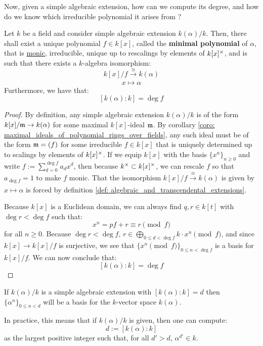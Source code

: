         Now, given a simple algebraic extension, how can we compute its degree, and how do we know which irreducible polynomial it arises from ?
        \begin{proposition} \label{prop: minimal_polynomials}
            Let $k$ be a field and consider simple algebraic extension $k(\alpha)/k$. Then, there shall exist a unique polynomial $f \in k[x]$, called the \textbf{minimal polynomial} of $\alpha$, that is \underline{monic}, irreducible, unique up to rescalings by elements of $k[x]^{\x}$, and is such that there exists a $k$-algebra isomorphism:
                $$k[x]/f \xrightarrow[]{\cong} k(\alpha)$$
                $$x \mapsto \alpha$$
            Furthermore, we have that:
                $$[k(\alpha) : k] = \deg f$$
        \end{proposition}
            \begin{proof}
                By definition, any simple algebraic extension $k(\alpha)/k$ is of the form $k[x]/\mathfrak{m} \to k(\alpha)$ for some maximal $k[x]$-ideal $\mathfrak{m}$. By corollary \ref{coro: maximal_ideals_of_polynomial_rings_over_fields}, any such ideal must be of the form $\mathfrak{m} = (f)$ for some irreducible $f \in k[x]$ that is uniquely determined up to scalings by elements of $k[x]^{\x}$. If we equip $k[x]$ with the basis $\{x^n\}_{n \geq 0}$ and write $f := \sum_{d = 0}^{\deg f} a_d x^d$, then because $k^{\x} \subset k[x]^{\x}$, we can rescale $f$ so that $a_{\deg f} = 1$ to make $f$ monic. That the isomorphism $k[x]/f \xrightarrow[]{\cong} k(\alpha)$ is given by $x \mapsto \alpha$ is forced by definition \ref{def: algebraic_and_transcendental_extensions}.

                Because $k[x]$ is a Euclidean domain, we can always find $q, r \in k[t]$ with $\deg r < \deg f$ such that:
                    $$x^n = p f + r \equiv r \pmod{f}$$
                for all $n \geq 0$. Because $\deg r < \deg f$, $r \in \bigoplus_{0 \leq d < \deg f} k \cdot x^n \pmod{f}$, and since $k[x] \to k[x]/f$ is surjective, we see that $\{x^n \pmod{f}\}_{0 \leq n < \deg f}$ is a basis for $k[x]/f$. We can now conclude that:
                    $$[k(\alpha) : k] = \deg f$$
            \end{proof}
        \begin{corollary} \label{coro: roots_of_minimal_polynomials}
            If $k(\alpha)/k$ is a simple algebraic extension with $[k(\alpha) : k] = d$ then $\{\alpha^n\}_{0 \leq n < d}$ will be a basis for the $k$-vector space $k(\alpha)$.

            In practice, this means that if $k(\alpha)/k$ is given, then one can compute:
                $$d := [k(\alpha) : k]$$
            as the largest positive integer such that, for all $d' > d$, $\alpha^{d'} \in k$. 
        \end{corollary}

